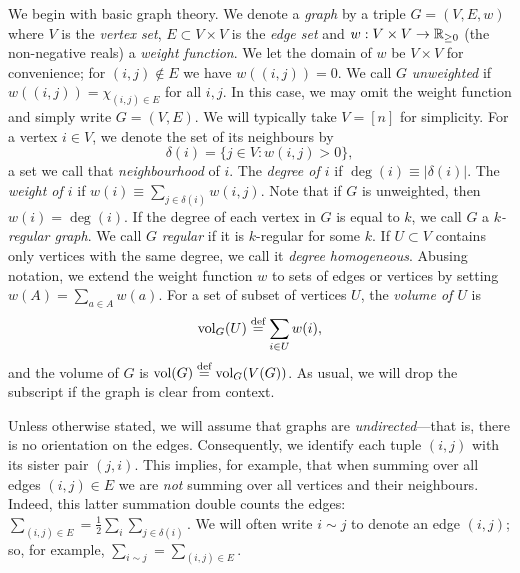 We begin with basic graph theory. 
We denote a \emph{graph} by a triple $G=(V,E,w)$ where $V$ is the \emph{vertex set}, $E\subset V\times V$ is the \emph{edge set} and $w:V\times V\to\mathbb{R}_{\geq0}$ (the non-negative reals) a \emph{weight function}. We let the domain of $w$ be $V\times V$ for convenience; for $(i,j)\notin E$ we have $w((i,j))=0$. We call $G$ \emph{unweighted} if $w((i,j))=\chi_{(i,j)\in E}$ for all $i,j$. In this case, we may omit the weight function and simply write $G=(V,E)$. 
We will typically take $V=[n]$ for simplicity. For a  vertex $i\in V$, we denote the set of its neighbours by 
\[\delta(i) = \{j\in V:w(i,j)>0\},\]
a set we call that \emph{neighbourhood} of $i$. The \emph{degree of $i$} if $\deg(i)\equiv |\delta(i)|$. The \emph{weight of $i$} if $w(i)\equiv \sum_{j\in \delta(i)}w(i,j)$. Note that if $G$ is unweighted, then $w(i)=\deg(i)$. If the degree of each vertex in $G$ is equal to $k$, we call $G$ a \emph{$k$-regular graph}. We call $G$ \emph{regular} if it is $k$-regular for some $k$. If $U\subset V$ contains only vertices with the same degree, we call it \emph{degree homogeneous}. 
Abusing notation, we extend the weight function $w$ to sets of edges or vertices by setting $w(A)=\sum_{a\in A}w(a)$. 
For a set of subset of vertices $U$, the \emph{volume of $U$} is 
\[\textnormal{vol}_G(U) \overset{\text{def}}{=} \sum_{i\in U}w(i),\]
and the volume of $G$ is $\textnormal{vol}(G) \overset{\text{def}}{=} \textnormal{vol}_G(V(G))$. As usual, we will drop the subscript if the graph is clear from context. 

Unless otherwise stated, we will assume that graphs are \emph{undirected}---that is, there is no orientation on the edges. Consequently, we identify each tuple $(i,j)$ with its sister pair $(j,i)$. This implies, for example, that when summing over all edges $(i,j)\in E$ we are \emph{not} summing over all vertices and their neighbours. Indeed, this latter summation double counts the edges: $\sum_{(i,j)\in E}=\frac{1}{2}\sum_{i}\sum_{j\in\delta(i)}$. We will often write $i\sim j$ to denote an edge $(i,j)$; so, for example, $\sum_{i\sim j}=\sum_{(i,j)\in E}$. 





